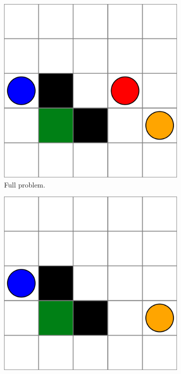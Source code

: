 \begin{figure}
    \centering
    \begin{subfigure}[b]{0.25\textwidth}
        \centering
        \includegraphics[width=\textwidth]{figures/scene_decomposition/g.pdf}
        \caption{Full problem.}
        \label{fig:ch6_fullg}
    \end{subfigure}
    \hfill
    \begin{subfigure}[b]{0.25\textwidth}
        \centering
        \includegraphics[width=\textwidth]{figures/scene_decomposition/g_sub1.pdf}

\end{subfigure}
\end{figure}
